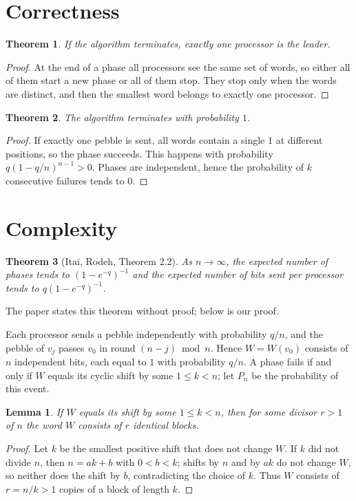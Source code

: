 \documentclass[11pt,a4paper]{article}
\newtheorem{theorem}{Theorem}
\newtheorem{lemma}{Lemma}
\begin{document}
\section{Correctness}

\begin{theorem}
If the algorithm terminates, exactly one processor is the leader.
\end{theorem}
\begin{proof}
At the end of a phase all processors see the same set of words, so either all of them start a new
phase or all of them stop. They stop only when the words are distinct, and then the smallest word
belongs to exactly one processor.
\end{proof}

\begin{theorem}
The algorithm terminates with probability $1$.
\end{theorem}
\begin{proof}
If exactly one pebble is sent, all words contain a single 1 at different positions, so the phase
succeeds. This happens with probability $q(1-q/n)^{n-1}>0$. Phases are independent, hence the
probability of $k$ consecutive failures tends to $0$.
\end{proof}

\section{Complexity}

\begin{theorem}[Itai, Rodeh, Theorem 2.2]
As $n\to\infty$, the expected number of phases tends to $(1-e^{-q})^{-1}$ and the expected number
of bits sent per processor tends to $q(1-e^{-q})^{-1}$.
\end{theorem}

The paper states this theorem without proof; below is our proof.

Each processor sends a pebble independently with probability $q/n$, and the pebble of $v_j$ passes
$v_0$ in round $(n-j) \bmod n$. Hence $W=W(v_0)$ consists of $n$ independent bits, each equal to $1$
with probability $q/n$. A phase fails if and only if $W$ equals its cyclic shift by some
$1\le k<n$; let $P_n$ be the probability of this event.

\begin{lemma}
If $W$ equals its shift by some $1\le k<n$, then for some divisor $r>1$ of $n$ the word $W$
consists of $r$ identical blocks.
\end{lemma}
\begin{proof}
Let $k$ be the smallest positive shift that does not change $W$. If $k$ did not divide $n$, then
$n=ak+b$ with $0<b<k$; shifts by $n$ and by $ak$ do not change $W$, so neither does the shift by
$b$, contradicting the choice of $k$. Thus $W$ consists of $r=n/k>1$ copies of a block of
length $k$.
\end{proof}
\end{document}
